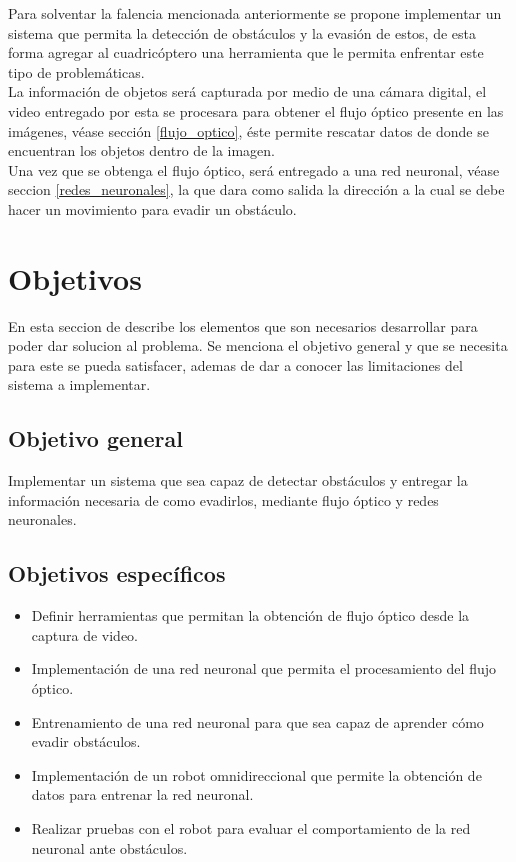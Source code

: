 \documentclass{iccmemoria}
\begin{document}
Para solventar la falencia mencionada anteriormente se propone implementar un sistema que permita la detección de obstáculos y la evasión de estos, de esta forma agregar al cuadricóptero una herramienta que le permita enfrentar este tipo de problemáticas.\\

La información de objetos será capturada por medio de una cámara digital, el video entregado por esta se procesara para obtener el flujo óptico presente en las imágenes, véase sección \ref{flujo_optico}, éste permite rescatar datos de donde se encuentran los objetos dentro de la imagen.\\

Una vez que se obtenga el flujo óptico, será entregado a una red neuronal, véase seccion \ref{redes_neuronales}, la que dara como salida la dirección a la cual se debe hacer un movimiento para evadir un obstáculo.\\

\section{Objetivos}

En esta seccion de describe los elementos que son necesarios desarrollar para poder dar solucion al problema. Se menciona el objetivo general y que se necesita para este se pueda satisfacer, ademas de dar a conocer las limitaciones del sistema a implementar.

\subsection{Objetivo general}

Implementar un sistema que sea capaz de detectar obstáculos y entregar la información necesaria de como evadirlos, mediante flujo óptico y redes neuronales.

\subsection{Objetivos específicos}
 
\begin{itemize}
    \item Definir herramientas que permitan la obtención de flujo óptico desde la captura de video.
    \item Implementación de una red neuronal que permita el procesamiento del flujo óptico.
    \item Entrenamiento de una red neuronal para que sea capaz de aprender cómo evadir obstáculos.
    \item Implementación de un robot omnidireccional que permite la obtención de datos para entrenar la red neuronal.
    \item Realizar pruebas con el robot para evaluar el comportamiento de la red neuronal ante obstáculos.
\end{itemize}
 
\end{document}
